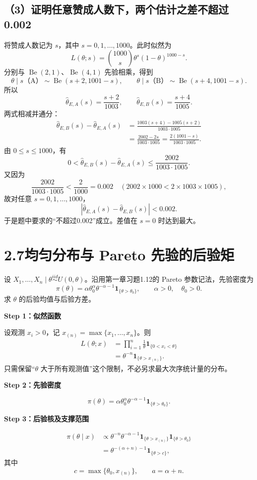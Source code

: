 \documentclass[UTF8,zihao=-4]{ctexart}
\newcommand{\step}[1]{\par\medskip\noindent\textbf{#1}\par\nopagebreak}
\newcommand{\Be}{\operatorname{Be}}
\newcommand{\ind}{\mathbf{1}}
\begin{document}
\subsection*{（3）证明任意赞成人数下，两个估计之差不超过0.002}
将赞成人数记为 $s$，其中 $s=0,1,\ldots,1000$。此时似然为
\[
L(\theta;s)=\binom{1000}{s}\theta^s(1-\theta)^{1000-s}.
\]
分别与 $\Be(2,1)$、$\Be(4,1)$ 先验相乘，得到
\[
\theta\mid s\text{（A）}\sim\Be(s+2,1001-s),\qquad
\theta\mid s\text{（B）}\sim\Be(s+4,1001-s).
\]
所以
\[
\hat\theta_{E,A}(s)=\frac{s+2}{1003},\qquad
\hat\theta_{E,B}(s)=\frac{s+4}{1005}.
\]
两式相减并通分：
\begin{align*}
\hat\theta_{E,B}(s)-\hat\theta_{E,A}(s)
&=\frac{1003(s+4)-1005(s+2)}{1003\cdot1005}\\
&=\frac{2002-2s}{1003\cdot1005}
=\frac{2(1001-s)}{1003\cdot1005}.
\end{align*}
由 $0\leq s\leq1000$，有
\[
0<\hat\theta_{E,B}(s)-\hat\theta_{E,A}(s)
\leq\frac{2002}{1003\cdot1005}.
\]
又因为
\[
\frac{2002}{1003\cdot1005}<\frac2{1000}=0.002
\quad\left(2002\times1000<2\times1003\times1005\right),
\]
故对任意 $s=0,1,\ldots,1000$，
\[
\boxed{\left|\hat\theta_{E,A}(s)-\hat\theta_{E,B}(s)\right|<0.002.}
\]
于是题中要求的“不超过0.002”成立。差值在 $s=0$ 时达到最大。

\section*{2.7\quad 均匀分布与 Pareto 先验的后验矩}
设 $X_1,\ldots,X_n\mid\theta\overset{iid}{\sim}U(0,\theta)$。沿用第一章习题1.12的 Pareto 参数记法，先验密度为
\[
\pi(\theta)=\alpha\theta_0^\alpha\theta^{-\alpha-1}
\ind_{\{\theta>\theta_0\}},\qquad\alpha>0,\quad\theta_0>0.
\]
求 $\theta$ 的后验均值与后验方差。

\step{Step 1：似然函数}
设观测 $x_i>0$，记 $x_{(n)}=\max\{x_1,\ldots,x_n\}$。则
\begin{align*}
L(\theta;x)
&=\prod_{i=1}^n\frac1\theta\ind_{\{0<x_i<\theta\}}\\
&=\theta^{-n}\ind_{\{\theta>x_{(n)}\}}.
\end{align*}
只需保留“$\theta$ 大于所有观测值”这个限制，不必另求最大次序统计量的分布。

\step{Step 2：先验密度}
\[
\pi(\theta)=\alpha\theta_0^\alpha\theta^{-\alpha-1}
\ind_{\{\theta>\theta_0\}}.
\]

\step{Step 3：后验核及支撑范围}
\begin{align*}
\pi(\theta\mid x)
&\propto\theta^{-n}\theta^{-\alpha-1}
\ind_{\{\theta>x_{(n)}\}}\ind_{\{\theta>\theta_0\}}\\
&=\theta^{-(\alpha+n)-1}\ind_{\{\theta>c\}},
\end{align*}
其中
\[
c=\max\{\theta_0,x_{(n)}\},\qquad a=\alpha+n.
\]
\end{document}
